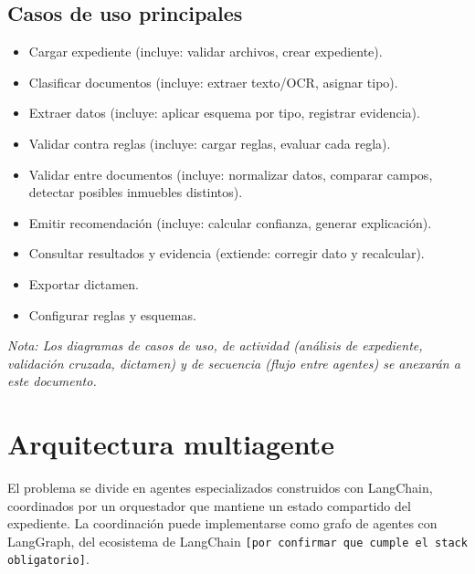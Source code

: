 \documentclass[11pt, a4paper]{article}
\begin{document}
\subsection*{Casos de uso principales}
\begin{itemize}
    \item Cargar expediente (incluye: validar archivos, crear expediente).
    \item Clasificar documentos (incluye: extraer texto/OCR, asignar tipo).
    \item Extraer datos (incluye: aplicar esquema por tipo, registrar evidencia).
    \item Validar contra reglas (incluye: cargar reglas, evaluar cada regla).
    \item Validar entre documentos (incluye: normalizar datos, comparar campos, detectar posibles inmuebles distintos).
    \item Emitir recomendación (incluye: calcular confianza, generar explicación).
    \item Consultar resultados y evidencia (extiende: corregir dato y recalcular).
    \item Exportar dictamen.
    \item Configurar reglas y esquemas.
\end{itemize}

\noindent\textit{Nota: Los diagramas de casos de uso, de actividad (análisis de expediente, validación cruzada, dictamen) y de secuencia (flujo entre agentes) se anexarán a este documento.}

\section{Arquitectura multiagente}

El problema se divide en agentes especializados construidos con LangChain, coordinados por un orquestador que mantiene un estado compartido del expediente. La coordinación puede implementarse como grafo de agentes con LangGraph, del ecosistema de LangChain \texttt{[por confirmar que cumple el stack obligatorio]}.
\end{document}
